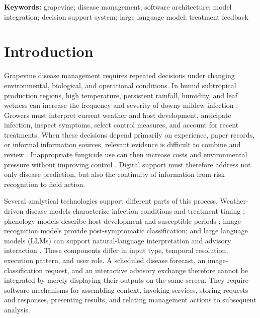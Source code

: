 \documentclass[12pt]{article}
\begin{document}
\noindent\textbf{Keywords:} grapevine; disease management; software architecture; model integration; decision support system; large language model; treatment feedback

\section{Introduction}\label{introduction}

Grapevine disease management requires repeated decisions under changing environmental, biological, and operational conditions. In humid subtropical production regions, high temperature, persistent rainfall, humidity, and leaf wetness can increase the frequency and severity of downy mildew infection \citep{gesslerPlasmoparaViticolaReview2011,yuEffectsRainShelter2017}. Growers must interpret current weather and host development, anticipate infection, inspect symptoms, select control measures, and account for recent treatments. When these decisions depend primarily on experience, paper records, or informal information sources, relevant evidence is difficult to combine and review \citep{tummersObstaclesFeaturesFarm2019,yaoInfluenceInformationSources2025}. Inappropriate fungicide use can then increase costs and environmental pressure without improving control \citep{oliverFungicideUsePatterns2023,zubrodFungicidesOverlookedPesticide2019}. Digital support must therefore address not only disease prediction, but also the continuity of information from risk recognition to field action.

Several analytical technologies support different parts of this process. Weather-driven disease models characterize infection conditions and treatment timing \citep{rossiMechanisticModelSimulating2008,caffiEvaluationDynamicModel2011}; phenology models describe host development and susceptible periods \citep{parkerGeneralPhenologicalModel2011a,wangAssessingGrapevinePhenological2020}; image-recognition models provide post-symptomatic classification; and large language models (LLMs) can support natural-language interpretation and advisory interaction \citep{raiAdvancingSitespecificDisease2026,yanCDIPChatGLM3DualmodelApproach2025}. These components differ in input type, temporal resolution, execution pattern, and user role. A scheduled disease forecast, an image-classification request, and an interactive advisory exchange therefore cannot be integrated by merely displaying their outputs on the same screen. They require software mechanisms for assembling context, invoking services, storing requests and responses, presenting results, and relating management actions to subsequent analysis.
\end{document}
